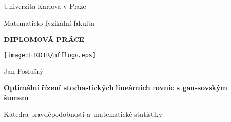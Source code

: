 
\pagestyle{empty}
\begin{center}


{\large Univerzita Karlova v Praze}

\medskip
{\large Matematicko-fyzikální fakulta}

\vfill
{\bfseries\Large DIPLOMOVÁ PRÁCE}

\vfill
\centerline{\mbox{\texttt{[image: \\FIGDIR/mfflogo.eps]}}}

\vfill
\vspace{5mm}

{\LARGE Jan Poslušný}

\vspace{15mm}

{\LARGE\bfseries  Optimální řízení stochastických lineárních rovnic s gaussovským šumem}

\vfill

Katedra pravděpodobnosti a~matematické statistiky


\vfill


\end{center}
